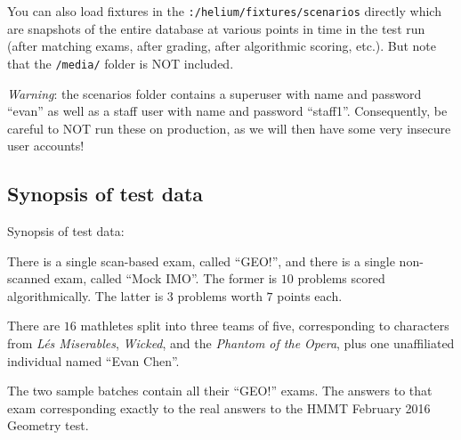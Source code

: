 You can also load fixtures in the \verb+:/helium/fixtures/scenarios+ directly
which are snapshots of the entire database at various points in time
in the test run
(after matching exams, after grading, after algorithmic scoring, etc.).
But note that the \verb+/media/+ folder is NOT included.

\emph{Warning}: the scenarios folder contains a superuser
with name and password ``evan''
as well as a staff user with name and password ``staff1''.
Consequently, be careful to NOT run these on production,
as we will then have some very insecure user accounts!

\subsection{Synopsis of test data}
Synopsis of test data:

\begin{itemize}
\ii There is a single scan-based exam, called ``GEO!'',
and there is a single non-scanned exam, called ``Mock IMO''.
The former is $10$ problems scored algorithmically.
The latter is $3$ problems worth $7$ points each.

\ii There are $16$ mathletes split into three teams of five,
corresponding to characters from \emph{L\'es Miserables},
\emph{Wicked}, and the \emph{Phantom of the Opera},
plus one unaffiliated individual named ``Evan Chen''.

\ii The two sample batches contain all their ``GEO!'' exams.
The answers to that exam corresponding exactly to the real answers
to the HMMT February 2016 Geometry test.
\end{itemize}


